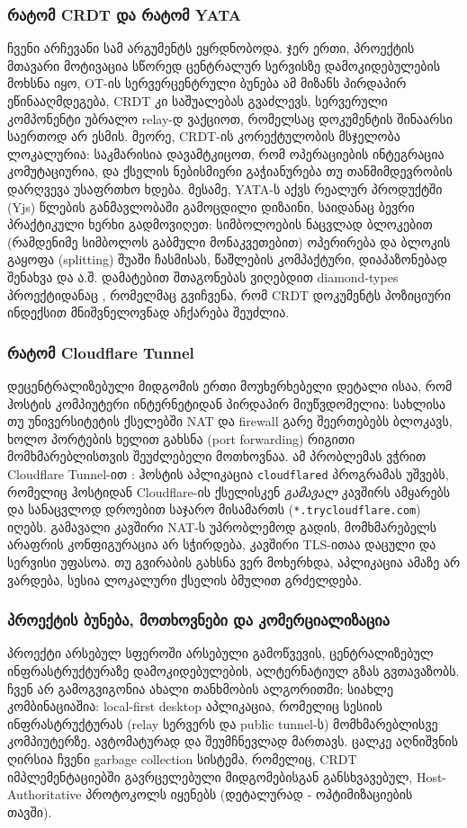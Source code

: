\subsubsection{რატომ CRDT და რატომ YATA}

ჩვენი არჩევანი სამ არგუმენტს ეყრდნობოდა. ჯერ ერთი, პროექტის მთავარი
მოტივაცია სწორედ ცენტრალურ სერვისზე დამოკიდებულების მოხსნა იყო, OT-ის
სერვერცენტრული ბუნება ამ მიზანს პირდაპირ ეწინააღმდეგება, CRDT კი
საშუალებას გვაძლევს, სერვერული კომპონენტი უბრალო relay-დ
ვაქციოთ, რომელსაც დოკუმენტის შინაარსი საერთოდ არ ესმის. მეორე, CRDT-ის
კორექტულობის მსჯელობა ლოკალურია: საკმარისია დავამტკიცოთ, რომ ოპერაციების
ინტეგრაცია კომუტაციურია, და ქსელის ნებისმიერი გაჭიანურება თუ
თანმიმდევრობის დარღვევა უსაფრთხო ხდება. მესამე, YATA-ს აქვს რეალურ
პროდუქტში (Yjs) წლების განმავლობაში გამოცდილი დიზაინი, საიდანაც ბევრი
პრაქტიკული ხერხი გადმოვიღეთ: სიმბოლოების ნაცვლად ბლოკებით (რამდენიმე
სიმბოლოს გაბმული მონაკვეთებით) ოპერირება და ბლოკის გაყოფა (splitting)
შუაში ჩასმისას, წაშლების კომპაქტური, დიაპაზონებად შენახვა და ა.შ.
დამატებით შთაგონებას ვიღებდით diamond-types პროექტიდანაც \cite{diamond},
რომელმაც გვიჩვენა, რომ CRDT დოკუმენტს პოზიციური ინდექსით მნიშვნელოვნად
აჩქარება შეუძლია.

\subsubsection{რატომ Cloudflare Tunnel}

დეცენტრალიზებული მიდგომის ერთი მოუხერხებელი დეტალი ისაა, რომ ჰოსტის
კომპიუტერი ინტერნეტიდან პირდაპირ მიუწვდომელია: სახლისა თუ უნივერსიტეტის
ქსელებში NAT და firewall გარე შეერთებებს ბლოკავს, ხოლო პორტების ხელით
გახსნა (port forwarding) რიგითი მომხმარებლისთვის შეუძლებელი მოთხოვნაა.
ამ პრობლემას ვჭრით Cloudflare Tunnel-ით \cite{cloudflared}: ჰოსტის
აპლიკაცია \texttt{cloudflared} პროგრამას უშვებს, რომელიც ჰოსტიდან
Cloudflare-ის ქსელისკენ \emph{გამავალ} კავშირს ამყარებს და სანაცვლოდ
დროებით საჯარო მისამართს (\texttt{*.trycloudflare.com}) იღებს. გამავალი
კავშირი NAT-ს უპრობლემოდ გადის, მომხმარებელს არაფრის კონფიგურაცია არ
სჭირდება, კავშირი TLS-ითაა დაცული და სერვისი უფასოა. თუ გვირაბის გახსნა
ვერ მოხერხდა, აპლიკაცია ამაზე არ ვარდება, სესია ლოკალური ქსელის ბმულით
გრძელდება.

\subsubsection{პროექტის ბუნება, მოთხოვნები და კომერციალიზაცია}

პროექტი არსებულ სფეროში არსებული გამოწვევის, ცენტრალიზებულ
ინფრასტრუქტურაზე დამოკიდებულების, ალტერნატიულ გზას გვთავაზობს.
ჩვენ არ გამოგვიგონია ახალი თანხმობის ალგორითმი; სიახლე კომბინაციაშია:
local-first desktop აპლიკაცია, რომელიც სესიის ინფრასტრუქტურას (relay
სერვერს და public tunnel-ს) მომხმარებლისვე კომპიუტერზე, ავტომატურად და
შეუმჩნევლად მართავს. ცალკე აღნიშვნის ღირსია ჩვენი garbage collection 
სისტემა, რომელიც, CRDT იმპლემენტაციებში გავრცელებული
მიდგომებისგან განსხვავებულ, Host-Authoritative პროტოკოლს იყენებს (დეტალურად -
ოპტიმიზაციების თავში).
